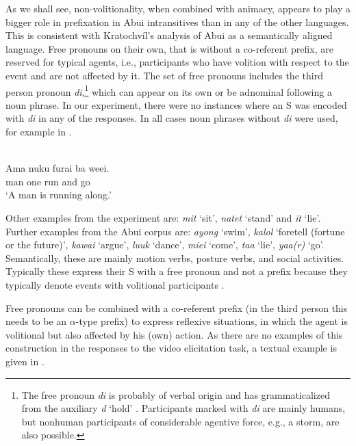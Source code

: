 As we shall see, non-volitionality, when combined with animacy, appears to play a bigger role in prefixation in Abui  intransitives than in any of the other languages. This is consistent with Kratochv\'il's analysis of Abui  as a semantically aligned  language. Free pronouns  on their own, that is without a co-referent prefix, are reserved for typical agents, i.e., participants who have volition with respect to the event and are not affected by it. The set of free pronouns  includes the third person pronoun \textit{di},\footnote{The free pronoun \textit{di} is probably of verbal origin and has grammaticalized from the auxiliary \textit{d} `hold' \citep{Kratochvil2011}. Participants marked with \textit{di} are mainly humans, but nonhuman participants of considerable agentive force, e.g., a storm, are also possible.} which can appear on its own or be adnominal following a noun phrase. In our experiment, there were no instances where an S was encoded with \textit{di} in any of the responses. In all cases noun phrases without \textit{di} were used, for example in .


\ea%
\label{bkm:Ref283206980}
 \\ 
\gll    Ama  nuku  furai  ba  weei.\\  
      man  one  run  and  go\\
\glt  `A man is running along.' 
\z







Other examples from the experiment are: \textit{mit} `sit', \textit{natet} `stand' and \textit{it} `lie'. Further examples from the Abui  corpus are: \textit{ayong} `swim', \textit{kalol} `foretell (fortune or the future)', \textit{kawai} `argue', \textit{luuk} `dance', \textit{miei} `come', \textit{taa} `lie', \textit{yaa(r)} `go'. Semantically, these are mainly motion verbs, posture verbs, and social activities. Typically these express their S with a free pronoun and not a prefix because they typically denote events with volitional participants . 

Free pronouns  can be combined with a co-referent prefix (in the third person this needs to be an $\alpha $-type prefix) to express reflexive situations, in which the agent is volitional but also affected by his (own) action. As there are no examples of this construction in the responses to the video elicitation task, a textual example is given in .


